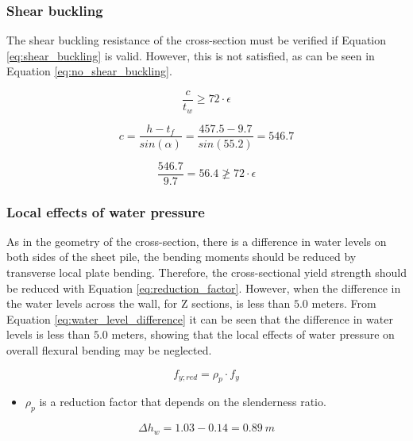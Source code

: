 \subsubsection{Shear buckling}

The shear buckling resistance of the cross-section must be verified if Equation \ref{eq:shear_buckling} is valid. However, this is not satisfied, as can be seen in Equation \ref{eq:no_shear_buckling}.

\begin{equation}
    \frac{c}{t_{w}} \geq 72 \cdot \epsilon
    \label{eq:shear_buckling}
\end{equation}

\begin{equation}
    c = \frac{h - t_{f}}{sin(\alpha)} = \frac{457.5 - 9.7}{sin(55.2)} = 546.7 
\end{equation}

\begin{equation}
    \frac{546.7}{9.7} = 56.4 \ngeq 72 \cdot \epsilon 
    \label{eq:no_shear_buckling}
\end{equation}

\subsubsection{Local effects of water pressure}

As in the geometry of the cross-section, there is a difference in water levels on both sides of the sheet pile, the bending moments should be reduced by transverse local plate bending. Therefore, the cross-sectional yield strength should be reduced with Equation \ref{eq:reduction_factor}. However, when the difference in the water levels across the wall, for Z sections, is less than $5.0$ meters. From Equation \ref{eq:water_level_difference} it can be seen that the difference in water levels is less than $5.0$ meters, showing that the local effects of water pressure on overall flexural bending may be neglected. 

\begin{equation}
    f_{y;red} = \rho_{p} \cdot f_{y}
    \label{eq:reduction_factor}
\end{equation}

\begin{itemize}
    \item $\rho_{p}$ is a reduction factor that depends on the slenderness ratio. 
\end{itemize}

\begin{equation}
    \Delta h_w = 1.03 - 0.14 = 0.89 \ m
    \label{eq:water_level_difference}
\end{equation}

